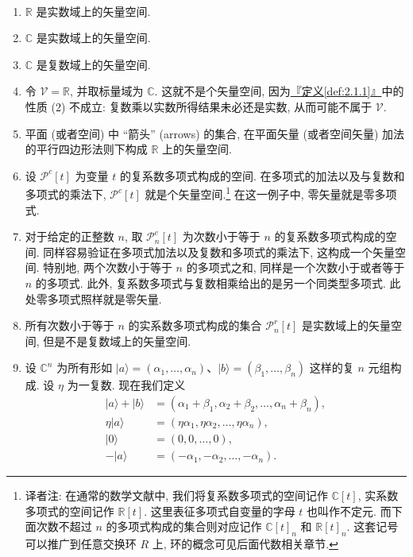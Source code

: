 \documentclass[lang=cn,zihao=-4,twoside,fontset=none]{textbook}
\newcommand{\defref}[1]{\hyperref[#1]{『定义\textnormal{\ref*{#1}}』}}
\renewcommand{\ket}[1]{| #1 \rangle}
\begin{document}
\begin{exam}[一些矢量空间]\label{eg:2.1.2} 
    ~%
    \begin{enumerate}[label=\textnormal{(\arabic*)}]
        \item $\mathbb R$ 是实数域上的矢量空间.
        \item $\mathbb C$ 是实数域上的矢量空间.
        \item $\mathbb C$ 是复数域上的矢量空间.
        \item 令 $\mathcal V=\mathbb R$, 并取标量域为 $\mathbb C$. 这就不是个矢量空间, 因为\defref{def:2.1.1}中的性质 \textnormal{(2)} 不成立: 复数乘以实数所得结果未必还是实数, 从而可能不属于 $\mathcal V$.
        \item 平面 (或者空间) 中 “箭头” (arrows) 的集合, 在平面矢量 (或者空间矢量) 加法的平行四边形法则下构成 $\mathbb R$ 上的矢量空间.
        \item 设 $\mathcal P^c[t]$ 为变量 $t$ 的复系数多项式构成的空间. 在多项式的加法以及与复数和多项式的乘法下, $\mathcal P^c[t]$ 就是个矢量空间.\footnote{译者注: 在通常的数学文献中, 我们将复系数多项式的空间记作 $\mathbb C[t]$, 实系数多项式的空间记作 $\mathbb R[t]$. 这里表征多项式自变量的字母 $t$ 也叫作不定元. 而下面次数不超过 $n$ 的多项式构成的集合则对应记作 $\mathbb C[t]_n$ 和 $\mathbb R[t]_n$. 这套记号可以推广到任意交换环 $R$ 上, 环的概念可见后面代数相关章节.} 在这一例子中, 零矢量就是零多项式. 
        \item 对于给定的正整数 $n$, 取 $\mathcal P^c_n[t]$ 为次数小于等于 $n$ 的复系数多项式构成的空间. 同样容易验证在多项式加法以及复数和多项式的乘法下, 这构成一个矢量空间. 特别地, 两个次数小于等于 $n$ 的多项式之和, 同样是一个次数小于或者等于 $n$ 的多项式. 此外, 复系数多项式与复数相乘给出的是另一个同类型多项式. 此处零多项式照样就是零矢量.
        \item 所有次数小于等于 $n$ 的实系数多项式构成的集合 $\mathcal P_n^r[t]$ 是实数域上的矢量空间, 但是不是复数域上的矢量空间.
        \item 设 $\mathbb C^n$ 为所有形如 $\ket{a}=(\alpha_1,\dots,\alpha_n)$、$\ket{b}=(\beta_1,\dots,\beta_n)$ 这样的复 $n$ 元组构成. 设 $\eta$ 为一复数. 现在我们定义
        $$
        \begin{aligned}
        \ket{a}+\ket{b}&=(\alpha_1+\beta_1,\alpha_2+\beta_2,\dots,\alpha_n+\beta_n),\\
        \eta\ket{a}&=(\eta\alpha_1,\eta\alpha_2,\dots,\eta\alpha_n),\\
        \ket{0}&=(0,0,\dots,0),\\
        -\ket{a}&=(-\alpha_1,-\alpha_2,\dots,-\alpha_n).

\end{aligned}$$
\end{enumerate}
\end{exam}
\end{document}
